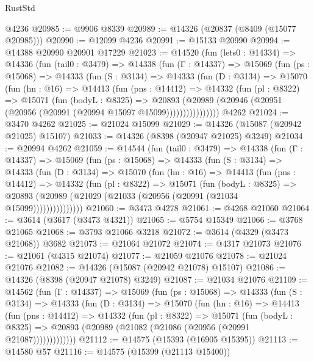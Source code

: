 \begin{lexlean}{RustStd}
\begin{coremodule}
    @4236
@20985 := @9906 @8339
@20989 := @14326 (@20837 (@8409 (@15077 @20985)))
@20990 := @12099 @4236
@20991 := @15133 @20990
@20994 := @14388 @20990 @20901 @17229
@21023 := @14520
    (fun (lets0 : @14334) =>
    @14336
      (fun (tail0 : @3479) =>
      @14338
        (fun (Γ : @14337) =>
        @15069
          (fun (ps : @15068) =>
          @14333
            (fun (S : @3134) =>
            @14333
              (fun (D : @3134) =>
              @15070
                (fun (hn : @16) =>
                @14413
                  (fun (pns : @14412) =>
                  @14332
                    (fun (pl : @8322) =>
                    @15071
                      (fun (bodyL : @8325) =>
                      @20893
                        (@20989
                          (@20946 (@20951 (@20956 (@20991 (@20994 @15097 @15099))))))))))))))))
    @4262
@21024 := @3470 @4262
@21025 := @21024 @15099
@21029 := @14326 (@15087 (@20942 @21025) @15107)
@21033 := @14326 (@8398 (@20947 @21025) @3249)
@21034 := @20994 @4262
@21059 := @14544
    (fun (tail0 : @3479) =>
    @14338
      (fun (Γ : @14337) =>
      @15069
        (fun (ps : @15068) =>
        @14333
          (fun (S : @3134) =>
          @14333
            (fun (D : @3134) =>
            @15070
              (fun (hn : @16) =>
              @14413
                (fun (pns : @14412) =>
                @14332
                  (fun (pl : @8322) =>
                  @15071
                    (fun (bodyL : @8325) =>
                    @20893 (@20989 (@21029 (@21033 (@20956 (@20991 (@21034 @15099)))))))))))))))
@21060 := @3473 @4278
@21061 := @4268 @21060
@21064 := @3614 (@3617 (@3473 @4321))
@21065 := @5754 @15349
@21066 := @3768 @21065
@21068 := @3793 @21066 @3218
@21072 := @3614 (@4329 (@3473 @21068)) @3682
@21073 := @21064 @21072
@21074 := @4317 @21073
@21076 := @21061 (@4315 @21074)
@21077 := @21059 @21076
@21078 := @21024 @21076
@21082 := @14326 (@15087 (@20942 @21078) @15107)
@21086 := @14326 (@8398 (@20947 @21078) @3249)
@21087 := @21034 @21076
@21109 := @14562
    (fun (Γ : @14337) =>
    @15069
      (fun (ps : @15068) =>
      @14333
        (fun (S : @3134) =>
        @14333
          (fun (D : @3134) =>
          @15070
            (fun (hn : @16) =>
            @14413
              (fun (pns : @14412) =>
              @14332
                (fun (pl : @8322) =>
                @15071
                  (fun (bodyL : @8325) =>
                  @20893 (@20989 (@21082 (@21086 (@20956 (@20991 @21087)))))))))))))
@21112 := @14575 (@15393 (@16905 @15395))
@21113 := @14580 @57
@21116 := @14575 (@15399 (@21113 @15400))

\end{coremodule}
\end{lexlean}

